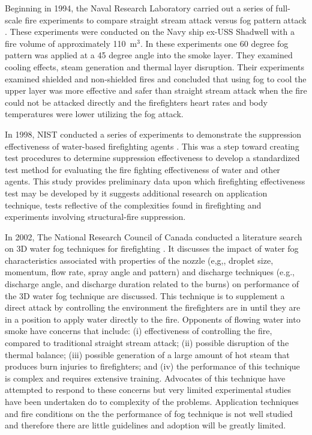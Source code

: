 \documentclass[12pt,oneside]{book}
\begin{document}
Beginning in 1994, the Naval Research Laboratory carried out a series of full-scale fire experiments to compare straight stream attack versus fog pattern attack \cite{Scheffey:1994_Attack_Team_Workshop}. These experiments were conducted on the Navy ship ex-USS Shadwell with a fire volume of approximately 110~m$^3$. In these experiments one 60 degree fog pattern was applied at a 45 degree angle into the smoke layer. They examined cooling effects, steam generation and thermal layer disruption. Their experiments examined shielded and non-shielded fires and concluded that using fog to cool the upper layer was more effective and safer than straight stream attack when the fire could not be attacked directly and the firefighters heart rates and body temperatures were lower utilizing the fog attack.

In 1998, NIST conducted a series of experiments to demonstrate the suppression effectiveness of water-based firefighting agents \cite{Madrzykowski:Fire_Suppression_Liquids}. This was a step toward creating test procedures to determine suppression effectiveness to develop a standardized test method for evaluating the fire fighting effectiveness of water and other agents. This study provides preliminary data upon which firefighting effectiveness test may be developed by it suggests additional research on application technique, tests reflective of the complexities found in firefighting and experiments involving structural-fire suppression.  

In 2002, The National Research Council of Canada conducted a literature search on 3D water fog techniques for firefighting \cite{Liu:Review_Water_Fog_Firefighting}. It discusses the impact of water fog characteristics associated with properties of the nozzle (e,g,, droplet size, momentum, flow rate, spray angle and pattern) and discharge techniques (e.g., discharge angle, and discharge duration related to the burns) on performance of the 3D water fog technique are discussed. This technique is to supplement a direct attack by controlling the environment the firefighters are in until they are in a position to apply water directly to the fire. Opponents of flowing water into smoke have concerns that include: (i) effectiveness of controlling the fire, compared to traditional straight stream attack; (ii) possible disruption of the thermal balance; (iii) possible generation of a large amount of hot steam that produces burn injuries to firefighters; and (iv) the performance of this technique is complex and requires extensive training. Advocates of this technique have attempted to respond to these concerns but very limited experimental studies have been undertaken do to complexity of the problems. Application techniques and fire conditions on the the performance of fog technique is not well studied and therefore there are little guidelines and adoption will be greatly limited.
\end{document}
